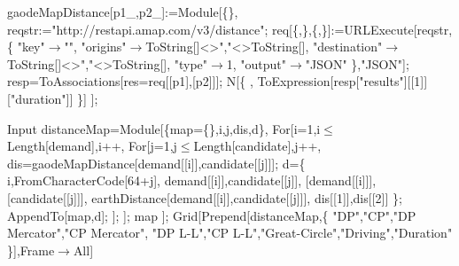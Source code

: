 \documentclass[10pt]{article}
\begin{document}
\begin{mmaCell}
  gaodeMapDistance[p1_,p2_]:=Module[\{\},
    reqstr:="http://restapi.amap.com/v3/distance";
    req[\{,\},\{,\}]:=URLExecute[reqstr,\{
      "key"\(\pmb{\to}\)"",
      "origins"\(\pmb{\to}\)ToString[]<>","<>ToString[],
      "destination"\(\pmb{\to}\)ToString[]<>","<>ToString[],
      "type"\(\pmb{\to}\)1,
      "output"\(\pmb{\to}\)"JSON"
    \},"JSON"];
    resp=ToAssociations[res=req[\mmaDef{\(\pmb{\xi}\)}[p1],\mmaDef{\(\pmb{\xi}\)}[p2]]];
    N[\{
      ,
      ToExpression[resp["results"][[1]]["duration"]]
    \}]
  ];
\end{mmaCell}

\begin{mmaCell}[moredefined={distanceMap, demand, candidate, gaodeMapDistance, earthDistance},morelocal={map, i, j, dis, d}]{Input}
  distanceMap=Module[\{map=\{\},i,j,dis,d\},
    For[i=1,i\(\pmb{\leq}\)Length[demand],i++,
      For[j=1,j\(\pmb{\leq}\)Length[candidate],j++,
        dis=gaodeMapDistance[demand[[i]],candidate[[j]]];
        d=\{
          i,FromCharacterCode[64+j],
          demand[[i]],candidate[[j]],
          \mmaDef{\(\pmb{\xi}\)}[demand[[i]]],\mmaDef{\(\pmb{\xi}\)}[candidate[[j]]],
          earthDistance[demand[[i]],candidate[[j]]],
          dis[[1]],dis[[2]]
        \};
        AppendTo[map,d];
      ];
    ];
    map
  ];
  Grid[Prepend[distanceMap,\{
    "DP","CP","DP Mercator","CP Mercator",
    "DP L-L","CP L-L","Great-Circle","Driving","Duration"
  \}],Frame\(\pmb{\to}\)All]
\end{mmaCell}
\end{document}
